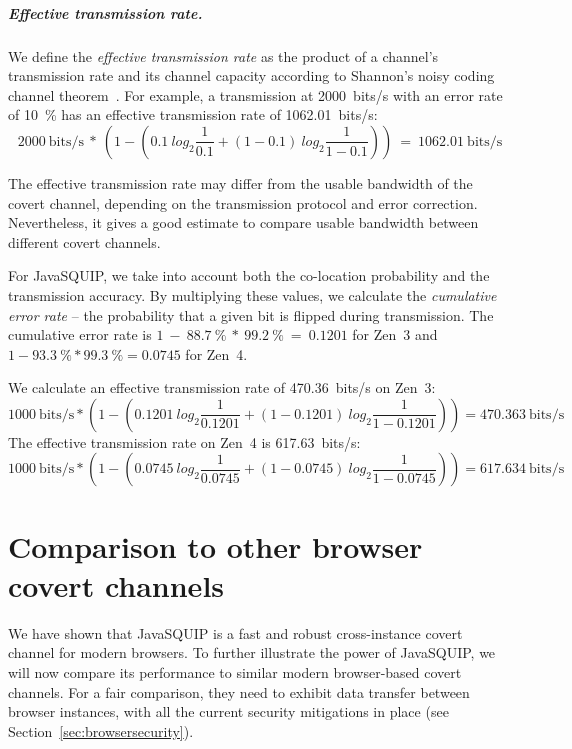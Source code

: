 \documentclass[11pt,
  titlepage=false,
  parskip=half,      %
]{scrreprt}
\begin{document}
\paragraph{Effective transmission rate.}
We define the \textit{effective transmission rate} as the product of a channel's transmission rate
and its channel capacity according to Shannon's noisy coding channel theorem~\cite{mackay2003information}.
For example, a transmission at 2000~bits/s with an error rate of 10~\%
has an effective transmission rate of 1062.01~bits/s:
\[2000~\text{bits/s}~*~\left( 1 - \left( 0.1~log_2\frac{1}{0.1} + (1 - 0.1)~log_2 \frac{1}{1 - 0.1} \right) \right)~=~1062.01~\text{bits/s}\]

The effective transmission rate may differ from the usable bandwidth of the covert channel,
depending on the transmission protocol and error correction.
Nevertheless, it gives a good estimate to compare usable bandwidth between different covert channels.

For JavaSQUIP, we take into account both the co-location probability and the transmission accuracy.
By multiplying these values, we calculate the \textit{cumulative error rate} -- the probability that a given bit is flipped during transmission.
The cumulative error rate is $1~-~88.7~\%~*~99.2~\%~=~0.1201$ for Zen~3
and $1 - 93.3~\% * 99.3~\% = 0.0745$ for Zen~4.

We calculate an effective transmission rate of 470.36~bits/s on Zen~3:
\[1000~\text{bits/s} * \left( 1 - \left( 0.1201~log_2 \frac{1}{0.1201} + (1 - 0.1201)~log_2 \frac{1}{1 - 0.1201} \right) \right) = 470.363~\text{bits/s}\]
The effective transmission rate on Zen~4 is 617.63~bits/s:
\[1000~\text{bits/s} * \left( 1 - \left( 0.0745~log_2 \frac{1}{0.0745} + (1 - 0.0745)~log_2 \frac{1}{1 - 0.0745} \right) \right) = 617.634~\text{bits/s}\]

\chapter{Comparison to other browser covert channels}
\label{ch:comparison}
We have shown that JavaSQUIP is a fast and robust cross-instance covert channel for modern browsers.
To further illustrate the power of JavaSQUIP,
we will now compare its performance to similar modern browser-based covert channels.
For a fair comparison, they need to exhibit data transfer between browser instances,
with all the current security mitigations in place (see Section~\ref{sec:browsersecurity}).
\end{document}
